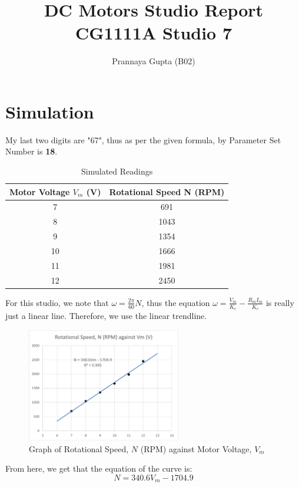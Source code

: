 \documentclass[a4paper,12pt,oneside, tikz]{book}
\title{\textbf{DC Motors} Studio Report \\ CG1111A Studio 7}
\author{Prannaya Gupta (B02)}
\begin{document}
\maketitle

\chapter{Simulation}

My last two digits are "67", thus as per the given formula, by Parameter Set Number is \textbf{18}.

\begin{table}[H]
    \centering
    \begin{tabular}{|c|c|}
         \hline Motor Voltage $V_m$ (V) & Rotational Speed N (RPM)  \\
         \hline 7 & 691 \\
         8 & 1043 \\
         9 & 1354 \\
         10 & 1666 \\
         11 & 1981 \\
         12 & 2450 \\
         \hline
    \end{tabular}
    \caption{Simulated Readings}
    \label{tab:activity1}
\end{table}

For this studio, we note that $\omega = \frac{2\pi}{60}N$, thus the equation $\omega = \frac{V_m}{K_e} - \frac{R_mI_m}{K_e}$ is really just a linear line. Therefore, we use the linear trendline.

\begin{figure}[H]
    \centering
    \includegraphics[width=0.6\textwidth]{images/activity1graph.png}
    \caption{Graph of Rotational Speed, $N$ (RPM) against Motor Voltage, $V_m$}
    \label{fig:activity1graph}
\end{figure}

From here, we get that the equation of the curve is:
$$N = 340.6V_m - 1704.9$$
\end{document}
